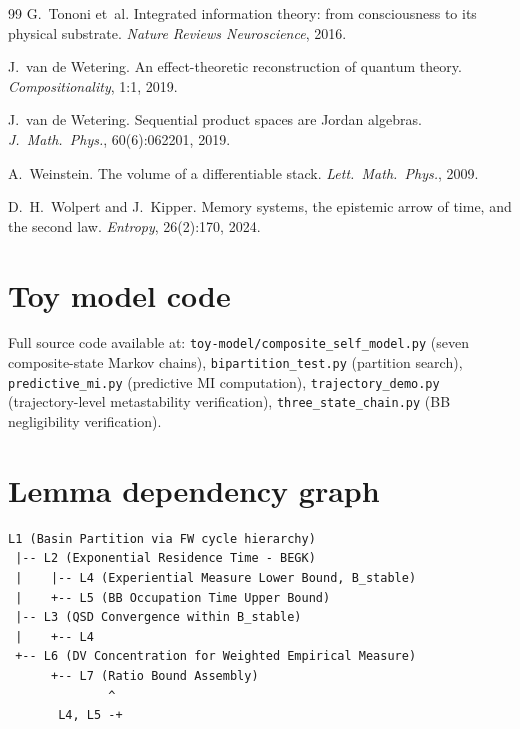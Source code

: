 \documentclass[12pt]{article}
\theoremstyle{remark}
\begin{document}
\begin{thebibliography}{99}
G.~Tononi et~al.
\newblock Integrated information theory: from consciousness to its physical substrate.
\newblock \emph{Nature Reviews Neuroscience}, 2016.

J.~van de Wetering.
\newblock An effect-theoretic reconstruction of quantum theory.
\newblock \emph{Compositionality}, 1:1, 2019.

J.~van de Wetering.
\newblock Sequential product spaces are {J}ordan algebras.
\newblock \emph{J.~Math.\ Phys.}, 60(6):062201, 2019.

A.~Weinstein.
\newblock The volume of a differentiable stack.
\newblock \emph{Lett.\ Math.\ Phys.}, 2009.

D.~H.~Wolpert and J.~Kipper.
\newblock Memory systems, the epistemic arrow of time, and the second law.
\newblock \emph{Entropy}, 26(2):170, 2024.

\end{thebibliography}



\appendix

\section{Toy model code}\label{app:code}

Full source code available at: \texttt{toy-model/composite\_self\_model.py} (seven composite-state Markov chains), \texttt{bipartition\_test.py} (partition search), \texttt{predictive\_mi.py} (predictive MI computation), \texttt{trajectory\_demo.py} (trajectory-level metastability verification), \texttt{three\_state\_chain.py} (BB negligibility verification).

\section{Lemma dependency graph}\label{app:lemmas}

\begin{verbatim}
L1 (Basin Partition via FW cycle hierarchy)
 |-- L2 (Exponential Residence Time - BEGK)
 |    |-- L4 (Experiential Measure Lower Bound, B_stable)
 |    +-- L5 (BB Occupation Time Upper Bound)
 |-- L3 (QSD Convergence within B_stable)
 |    +-- L4
 +-- L6 (DV Concentration for Weighted Empirical Measure)
      +-- L7 (Ratio Bound Assembly)
              ^
       L4, L5 -+
\end{verbatim}
\end{document}
